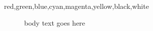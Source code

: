 \documentclass{article}
\begin{document}
\begin{description}
  \item[red,green,blue,cyan,magenta,yellow,black,white] body text goes here
\end{description}
\caption[short,list,entry,that,is,long,enough,to,overflow,the,width]{Full}
\end{document}
